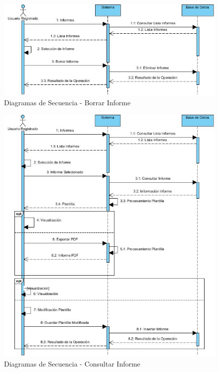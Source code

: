 \documentclass[a4paper,11pt]{book}
\begin{document}
\begin{figure}[H] 
\centering 
\includegraphics[scale=0.50]{imagenes/secuencia/Borrar_Informe.jpg}
\caption{ Diagramas de Secuencia - Borrar Informe\cite{diagrama}  }  
\end{figure}

\begin{figure}[H] 
\centering 
\includegraphics[scale=0.50]{imagenes/secuencia/Consultar_Informe.jpg}
\caption{ Diagramas de Secuencia - Consultar Informe\cite{diagrama}  }  
\end{figure}
\end{document}

